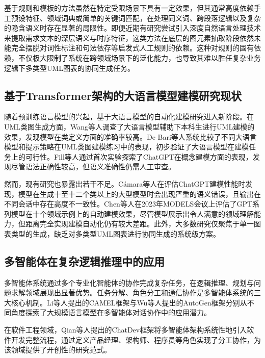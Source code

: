 基于规则和模板的方法虽然在特定受限场景下具有一定效果，但其通常高度依赖手工预设特征、领域词典或简单的关键词匹配，在处理同义词、跨段落逻辑以及复杂的隐含语义时存在显著的局限性\cite{meng2024automated, abdelnabi2020generating, zhaohuipan2021}。即便近期有研究尝试引入深度自然语言处理技术来提取需求文本的深层语义与时序特征，这类方法在底层的图元素抽取阶段依然未能完全摆脱对词性标注和句法依存等启发式人工规则的依赖\cite{yuan2026automatedadgc}。这种对规则的固有依赖，不仅极大限制了系统在跨领域场景下的泛化能力，也导致其难以胜任复杂业务逻辑下多类型UML图表的协同生成任务。

\subsection{基于Transformer架构的大语言模型建模研究现状}

随着预训练语言模型的兴起，基于大语言模型的自动化建模研究进入新阶段。在UML类图生成方面，Wang等人\cite{wang2024llms}调查了大语言模型辅助下本科生进行UML建模的效果，发现模型在类定义方面的准确率较高。De Bari等人\cite{debari2024evaluating,dirocco2024use}系统比较了不同大语言模型和提示策略在UML类图建模练习中的表现，初步验证了大语言模型在建模任务上的可行性。Fill等人\cite{fill2023conceptual}通过首次实验探索了ChatGPT在概念建模方面的表现，发现尽管语法正确性较高，但语义准确性仍需人工审查。

然而，现有研究也暴露出若干不足。Cámara等人\cite{camara2023assessment}在评估ChatGPT建模性能时发现，模型在生成十至十二个类以上的大型模型时会出现严重的语义错误，且输出在不同会话中存在高度不一致性。Chen等人\cite{chen2023automated}在2023年MODELS会议上评估了GPT系列模型在十个领域示例上的自动建模效果，尽管模型展示出令人满意的领域理解能力，但距离完全实现建模自动化仍有较大差距。此外，大多数研究仅聚焦于单一图表类型的生成，缺乏对多类型UML图表进行协同生成的系统级方案\cite{giannouris2025nomad,nguyen2026class}。

\subsection{多智能体在复杂逻辑推理中的应用}

多智能体系统通过多个专业化智能体的协作完成复杂任务，在逻辑推理、规划与问题求解领域展现出显著优势。任务分解、角色分工和通信协作是多智能体系统的三大核心机制。Li等人\cite{li2023camel}提出的CAMEL框架与Wu等人\cite{wu2023autogen}提出的AutoGen框架分别从不同角度探索了大规模语言模型在多智能体对话协作中的应用潜力。

在软件工程领域，Qian等人\cite{qian2023chatdev}提出的ChatDev框架将多智能体架构系统性地引入软件开发完整流程，通过定义产品经理、架构师、程序员等角色实现了分工协作，为该领域提供了开创性的研究范式。


